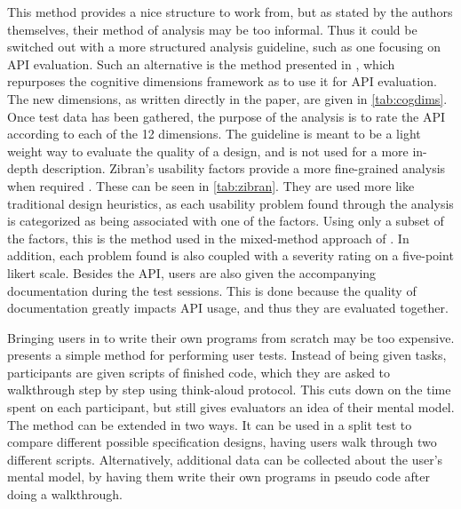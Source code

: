 This method provides a nice structure to work from, but as stated by the authors themselves, their method of analysis may be too informal.
Thus it could be switched out with a more structured analysis guideline, such as one focusing on \gls{API} evaluation.
Such an alternative is the method presented in \cite{clarke2003using}, which repurposes the cognitive dimensions framework \cite{wikiCognitiveDimensions} as to use it for \gls{API} evaluation.
The new dimensions, as written directly in the paper, are given in \ref{tab:cogdims}.
Once test data has been gathered, the purpose of the analysis is to rate the \gls{API} according to each of the 12 dimensions.
The guideline is meant to be a light weight way to evaluate the quality of a design, and is not used for a more in-depth description.
Zibran’s usability factors provide a more fine-grained analysis when required \cite{zibran2011useful}.
These can be seen in \ref{tab:zibran}.
They are used more like traditional design heuristics, as each usability problem found through the analysis is categorized as being associated with one of the factors.
Using only a subset of the factors, this is the method used in the mixed-method approach of \cite{grill2012methods}.
In addition, each problem found is also coupled with a severity rating on a five-point likert scale\cite{wikiLikert}. 
Besides the \gls{API}, users are also given the accompanying documentation during the test sessions. 
This is done because the quality of documentation greatly impacts \gls{API} usage, and thus they are evaluated together. 

Bringing users in to write their own programs from scratch may be too expensive.
\cite{o2010api} presents a simple method for performing user tests.
Instead of being given tasks, participants are given scripts of finished code, which they are asked to walkthrough step by step using think-aloud protocol.
This cuts down on the time spent on each participant, but still gives evaluators an idea of their mental model.
The method can be extended in two ways. 
It can be used in a split test to compare different possible specification designs, having users walk through two different scripts.
Alternatively, additional data can be collected about the user’s mental model, by having them write their own programs in pseudo code after doing a walkthrough.


